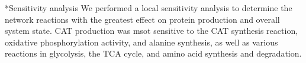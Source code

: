 \documentclass[12pt]{article}
\makeatletter
\renewcommand\subsection{\@startsection
	{subsection}{2}{0mm}
	{-0.05in}
	{-0.5\baselineskip}
	{\normalfont\normalsize\bfseries}}
\makeatother
\begin{document}
\subsection*{Sensitivity analysis}
We performed a local sensitivity analysis to determine the network reactions with the greatest effect on protein production and overall system state.
CAT production was msot sensitive to the CAT synthesis reaction, oxidative phosphorylation activity, and alanine synthesis, as well as various reactions in glycolysis, the TCA cycle, and amino acid synthesis and degradation.
    
\end{document}
